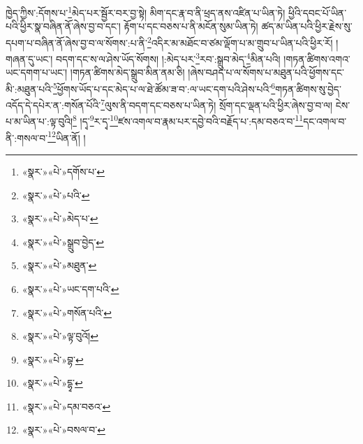 ཁྱེད་ཀྱིས་:དོགས་པ་\footnote{«སྣར་»«པེ་»དགོས་པ་}མེད་པར་སྦྱོར་བར་བྱ་སྟེ། མིག་དང་རྣ་བ་ནི་ཕྲད་ནས་འཛིན་པ་ཡིན་ཏེ། ཕྱིའི་དབང་པོ་ཡིན་པའི་ཕྱིར་སྣ་བཞིན་ནོ་ཞེས་བྱ་བ་དང་། རྟོག་པ་དང་བཅས་པ་ནི་མངོན་སུམ་ཡིན་ཏེ། ཚད་མ་ཡིན་པའི་ཕྱིར་རྗེས་སུ་དཔག་པ་བཞིན་ནོ་ཞེས་བྱ་བ་ལ་སོགས་:པ་ནི་\footnote{«སྣར་»«པེ་»པའི་}འདིར་མ་མཐོང་བ་ཙམ་ལྡོག་པ་མ་གྲུབ་པ་ཡིན་པའི་ཕྱིར་རོ། །གཞན་དུ་ཡང་། བདག་དང་ས་ལ་ཤེས་ཡོད་སོགས། །:མེད་པར་\footnote{«སྣར་»«པེ་»མེད་པ་}རབ་:སྒྲུབ་མེད་\footnote{«སྣར་»«པེ་»སྒྲུབ་བྱེད་}མིན་པའི། །གཏན་ཚིགས་འགའ་ཡང་དགག་པ་ཡང་། །གཏན་ཚིགས་མེད་སྒྲུབ་མིན་ནམ་ཅི། །ཞེས་བཤད་པ་ལ་སོགས་པ་མཐུན་པའི་ཕྱོགས་དང་མི་:མཐུན་པའི་\footnote{«སྣར་»«པེ་»མཐུན་}ཕྱོགས་ཡོད་པ་དང་མེད་པ་ལ་ཐེ་ཚོམ་ཟ་བ་:ལ་ཡང་དག་པའི་ཤེས་པའི་\footnote{«སྣར་»«པེ་»ཡང་དག་པའི་}གཏན་ཚིགས་སུ་བྱེད་འདོད་དེ་དཔེར་ན་:གསོན་པོའི་\footnote{«སྣར་»«པེ་»གསོན་པའི་}ལུས་ནི་བདག་དང་བཅས་པ་ཡིན་ཏེ། སྲོག་དང་ལྡན་པའི་ཕྱིར་ཞེས་བྱ་བ་ལ། ངེས་པ་མ་ཡིན་པ་:ལྟ་བུའི།\footnote{«སྣར་»«པེ་»ལྟ་བུའོ།} །དྭ་\footnote{«སྣར་»«པེ་»བྷ་}ར་དྭ་\footnote{«སྣར་»«པེ་»དྷྭ་}ཛས་འགལ་བ་རྣམ་པར་དབྱེ་བའི་བརྗོད་པ་:དམ་བཅའ་བ་\footnote{«སྣར་»«པེ་»དམ་བཅའ་}དང་འགལ་བ་ནི་:གསལ་བ་\footnote{«སྣར་»«པེ་»བསལ་བ་}ཡིན་ནོ། །

